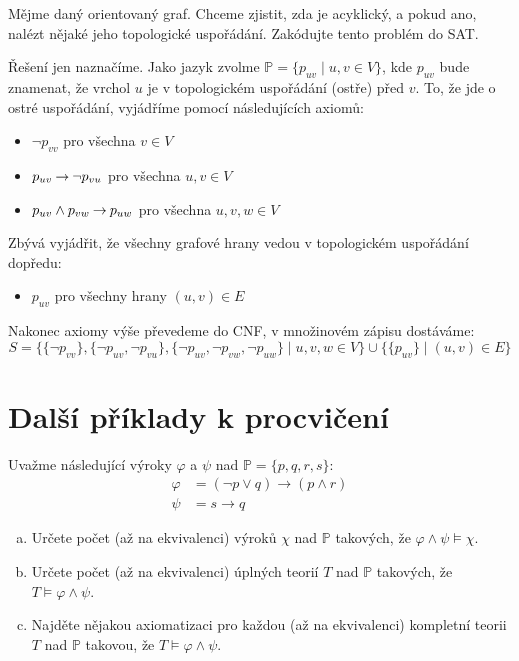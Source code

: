 \begin{problem}

    Mějme daný orientovaný graf. Chceme zjistit, zda je acyklický, a pokud ano, nalézt nějaké jeho topologické uspořádání. Zakódujte tento problém do SAT.

    \begin{solution}
        Řešení jen naznačíme. Jako jazyk zvolme $\mathbb P=\{p_{uv}\mid u,v\in V\}$, kde $p_{uv}$ bude znamenat, že vrchol $u$ je v topologickém uspořádání (ostře) před $v$. To, že jde o ostré uspořádání, vyjádříme pomocí následujících axiomů:
        \begin{itemize}
            \item $\neg p_{vv}$ pro všechna $v\in V$
            \item $p_{uv}\mathbin{\rightarrow}\neg p_{vu}$ pro všechna $u,v\in V$
            \item $p_{uv}\land p_{vw}\mathbin{\rightarrow} p_{uw}$ pro všechna $u,v,w\in V$
        \end{itemize}
        Zbývá vyjádřit, že všechny grafové hrany vedou v topologickém uspořádání dopředu:
        \begin{itemize}
            \item $p_{uv}$ pro všechny hrany $(u,v)\in E$
        \end{itemize}
        Nakonec axiomy výše převedeme do CNF, v množinovém zápisu dostáváme:
        $$
        S=\{\{\neg p_{vv}\},\{\neg p_{uv},\neg p_{vu}\},\{\neg p_{uv},\neg p_{vw},\neg p_{uw}\} \mid u,v,w\in V\}\cup\{\{p_{uv}\}\mid(u,v)\in E\}
        $$



    \end{solution}

\end{problem}
    
    
\section*{Další příklady k procvičení}
    

\begin{problem}

    Uvažme následující výroky $\varphi$ a $\psi$ nad $\mathbb P=\{p, q, r, s\}$:
    \begin{align*}
        \varphi &= (\neg p \vee  q)\to(p\wedge r)\\
        \psi &= s\to q
    \end{align*}
    \begin{enumerate}[(a)]
        \item Určete počet (až na ekvivalenci) výroků $\chi$ nad $\mathbb P$ takových, že $\varphi\wedge\psi\models\chi$.
        \item Určete počet (až na ekvivalenci) úplných teorií $T$ nad $\mathbb P$ takových, že $T\models\varphi\wedge\psi$.
        \item Najděte nějakou axiomatizaci pro každou (až na ekvivalenci) kompletní teorii $T$ nad $\mathbb P$ takovou, že $T\models\varphi\wedge\psi$.
    \end{enumerate}

\end{problem}


